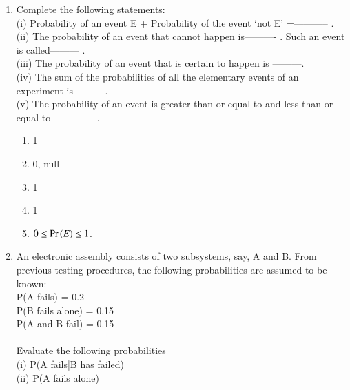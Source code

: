 \begin{enumerate}[label=\thesection.\arabic*.,ref=\thesection.\theenumi]
\item Complete the following statements:\\
 (i) Probability of an event E + Probability of the event ‘not E’ =----------- .\\
 (ii) The probability of an event that cannot happen is---------- . Such an event is called--------- .\\
 (iii) The probability of an event that is certain to happen is ---------.\\
 (iv) The sum of the probabilities of all the elementary events of an experiment is----------.\\ 
 (v) The probability of an event is greater than or equal to and less than or equal to --------------.\\
 \solution
 \begin{enumerate}
 \item 1
 \item 0, null
 \item 1
 \item 1
 \item $0 \le \Pr\left(E\right) \le 1$.
 \end{enumerate}
 \item An electronic assembly consists of two subsystems, say, A and B. From previous testing procedures, the following probabilities are assumed to be known:\\
P(A fails) = 0.2\\
P(B fails alone) = 0.15\\
P(A and B fail) = 0.15\\
\\Evaluate the following probabilities\\
(i) P(A fails|B has failed) \\
(ii) P(A fails alone)\\
\solution



\end{enumerate}

